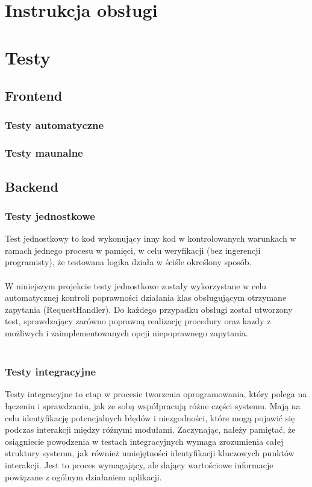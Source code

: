 \documentclass[12pt,a4paper]{article}
\begin{document}
\newpage
\section{Instrukcja obsługi}

\newpage

\section{Testy}
    \subsection{Frontend}
        \subsubsection{Testy automatyczne}
        \subsubsection{Testy maunalne}
    \subsection{Backend}
        \subsubsection{Testy jednostkowe}
Test jednostkowy to kod wykonujący inny kod w kontrolowanych warunkach w ramach jednego procesu w pamięci, w celu weryfikacji (bez ingerencji programisty), że testowana logika działa w ściśle określony sposób.
\\\\
W niniejszym projekcie testy jednostkowe zostały wykorzystane w celu automatycznej kontroli poprawności działania klas obsługującym otrzymane zapytania (RequestHandler). Do każdego przypadku obsługi został utworzony test, sprawdzający zarówno poprawną realizację procedury oraz kazdy z możliwych i zaimplementowanych opcji niepoprawnego zapytania.
\\\\


        \subsubsection{Testy integracyjne}
Testy integracyjne to etap w procesie tworzenia oprogramowania, który polega na łączeniu i sprawdzaniu, jak ze sobą współpracują różne części systemu. Mają na celu identyfikację potencjalnych błędów i niezgodności, które mogą pojawić się podczas interakcji między różnymi modułami. Zaczynając, należy pamiętać, że osiągniecie powodzenia w testach integracyjnych wymaga zrozumienia całej struktury systemu, jak również umiejętności identyfikacji kluczowych punktów interakcji. Jest to proces wymagający, ale dający wartościowe informacje powiązane z ogólnym działaniem aplikacji.
\end{document}
